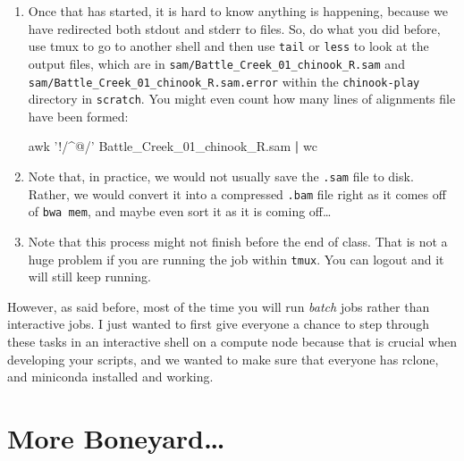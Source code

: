 \documentclass[]{krantz}
\makeatletter
\newenvironment{Shaded}{\begin{snugshade}}{\end{snugshade}}
\newcommand{\CommentTok}[1]{\textcolor[rgb]{0.37,0.37,0.37}{\textit{#1}}}
\newcommand{\ExtensionTok}[1]{#1}
\newcommand{\FunctionTok}[1]{\textcolor[rgb]{0,0,0}{#1}}
\newcommand{\KeywordTok}[1]{\textcolor[rgb]{0.27,0.27,0.27}{\textbf{#1}}}
\newcommand{\NormalTok}[1]{#1}
\newcommand{\OperatorTok}[1]{\textcolor[rgb]{0.43,0.43,0.43}{\textbf{#1}}}
\newcommand{\StringTok}[1]{\textcolor[rgb]{0.5,0.5,0.5}{#1}}
\newcommand{\VariableTok}[1]{\textcolor[rgb]{0,0,0}{#1}}
\newenvironment{kframe}{%
\medskip{}
\setlength{\fboxsep}{.8em}
 \def\at@end@of@kframe{}%
 \ifinner\ifhmode%
  \def\at@end@of@kframe{\end{minipage}}%
  \begin{minipage}{\columnwidth}%
 \fi\fi%
 \def\FrameCommand##1{\hskip\@totalleftmargin \hskip-\fboxsep
 \colorbox{shadecolor}{##1}\hskip-\fboxsep
     \hskip-\linewidth \hskip-\@totalleftmargin \hskip\columnwidth}%
 \MakeFramed {\advance\hsize-\width
   \@totalleftmargin\z@ \linewidth\hsize
   \@setminipage}}%
 {\par\unskip\endMakeFramed%
 \at@end@of@kframe}
\renewenvironment{Shaded}{\begin{kframe}}{\end{kframe}}
\makeatother
\begin{document}
\begin{enumerate}
\begin{Shaded}
\end{Shaded}
\item
  Once that has started, it is hard to know anything is happening, because we have
  redirected both stdout and stderr to files. So, do what you did before, use tmux to
  go to another shell and then use \texttt{tail} or \texttt{less} to look at the output files, which
  are in \texttt{sam/Battle\_Creek\_01\_chinook\_R.sam} and \texttt{sam/Battle\_Creek\_01\_chinook\_R.sam.error}
  within the \texttt{chinook-play} directory in \texttt{scratch}. You might even count how many
  lines of alignments file have been formed:

\begin{Shaded}
\begin{Highlighting}[]
\FunctionTok{awk} \StringTok{'!/^@/'}\NormalTok{ Battle_Creek_01_chinook_R.sam }\KeywordTok{|} \FunctionTok{wc} 
\end{Highlighting}
\end{Shaded}
\item
  Note that, in practice, we would not usually save the \texttt{.sam} file to disk. Rather, we would
  convert it into a compressed \texttt{.bam} file right as it comes off of \texttt{bwa\ mem}, and maybe even sort it
  as it is coming off\ldots{}
\item
  Note that this process might not finish before the end of class. That is not a huge problem
  if you are running the job within \texttt{tmux}. You can logout and it will still keep running.
\end{enumerate}

However, as said before, most of the time you will run \emph{batch} jobs rather than interactive jobs.
I just wanted to first give everyone a chance to step through these tasks in an interactive shell
on a compute node because that is crucial when developing your scripts, and we wanted to
make sure that everyone has rclone, and miniconda installed and working.

\hypertarget{more-boneyard}{%
\section{More Boneyard\ldots{}}\label{more-boneyard}}
\end{document}
